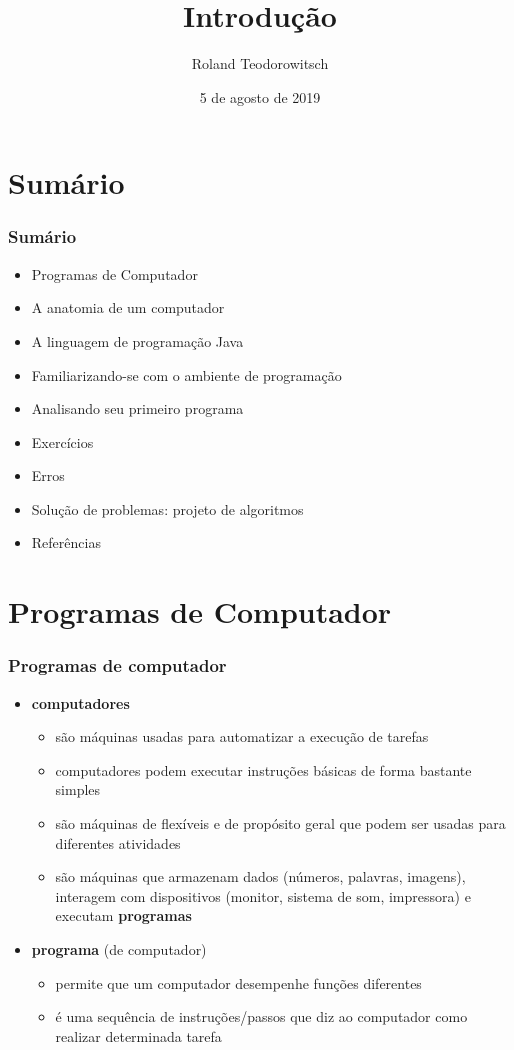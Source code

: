 \documentclass[aspectratio=169]{beamer}
\title[\sc{Introdução}]{Introdução}
\author[Roland Teodorowitsch]{Roland Teodorowitsch}
\institute[FPROG - EP - PUCRS]{Fundamentos de Programação - Escola Politécnica - PUCRS}
\date{5 de agosto de 2019}
\begin{document}
\justifying

\begin{frame}
	\titlepage
\end{frame}

\section{Sumário}

\begin{frame}\frametitle{Sumário}
\begin{itemize}
	\item Programas de Computador
	\item A anatomia de um computador
	\item A linguagem de programação Java
	\item Familiarizando-se com o ambiente de programação
	\item Analisando seu primeiro programa
	\item Exercícios
	\item Erros
	\item Solução de problemas: projeto de algoritmos
	\item Referências
\end{itemize}
\end{frame}


\section{Programas de Computador}

\begin{frame}\frametitle{Programas de computador}
\begin{itemize}
	\item \textbf{computadores}
	\begin{itemize}
		\item são máquinas usadas para automatizar a execução de tarefas
		\item computadores podem executar instruções básicas de forma bastante simples
		\item são máquinas de flexíveis e de propósito geral que podem ser usadas para diferentes atividades
		\item são máquinas que armazenam dados (números, palavras, imagens), interagem com dispositivos (monitor, sistema de som, impressora) e executam \textbf{programas}
	\end{itemize}
	\item \textbf{programa} (de computador)
	\begin{itemize}
		\item permite que um computador desempenhe funções diferentes
		\item é uma sequência de instruções/passos que diz ao computador como realizar determinada tarefa
	\end{itemize}
\end{itemize}
\end{frame}
\end{document}
